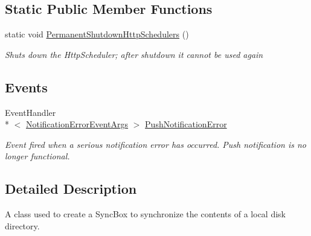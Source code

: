 \subsection*{Static Public Member Functions}
\begin{DoxyCompactItemize}
\item 
static void \hyperlink{class_cloud_api_public_1_1_c_l_sync_a7a29b0dcbd944c097648ec0f075b29a8}{Permanent\-Shutdown\-Http\-Schedulers} ()
\begin{DoxyCompactList}\small\item\em Shuts down the Http\-Scheduler; after shutdown it cannot be used again \end{DoxyCompactList}\end{DoxyCompactItemize}
\subsection*{Events}
\begin{DoxyCompactItemize}
\item 
Event\-Handler\\*
$<$ \hyperlink{class_cloud_api_public_1_1_push_notification_1_1_notification_error_event_args}{Notification\-Error\-Event\-Args} $>$ \hyperlink{class_cloud_api_public_1_1_c_l_sync_a986a038f0f504de78c6ea811dacb0b21}{Push\-Notification\-Error}
\begin{DoxyCompactList}\small\item\em Event fired when a serious notification error has occurred. Push notification is no longer functional. \end{DoxyCompactList}\end{DoxyCompactItemize}


\subsection{Detailed Description}
A class used to create a Sync\-Box to synchronize the contents of a local disk directory. 



